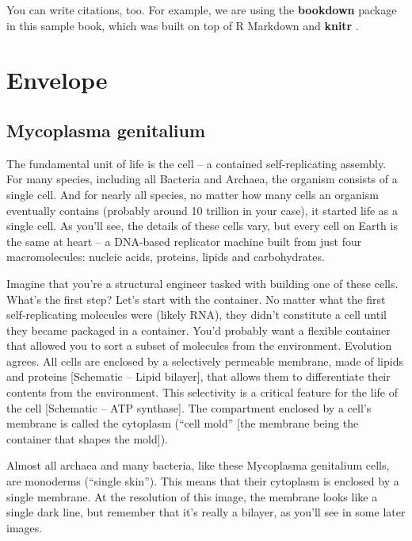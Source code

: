 \documentclass[]{book}
\begin{document}
You can write citations, too. For example, we are using the
\textbf{bookdown} package \citep{R-bookdown} in this sample book, which
was built on top of R Markdown and \textbf{knitr} \citep{xie2015}.

\chapter{Envelope}\label{envelope}

\section{Mycoplasma genitalium}\label{mycoplasma-genitalium}

The fundamental unit of life is the cell -- a contained self-replicating
assembly. For many species, including all Bacteria and Archaea, the
organism consists of a single cell. And for nearly all species, no
matter how many cells an organism eventually contains (probably around
10 trillion in your case), it started life as a single cell. As you'll
see, the details of these cells vary, but every cell on Earth is the
same at heart -- a DNA-based replicator machine built from just four
macromolecules: nucleic acids, proteins, lipids and carbohydrates.

Imagine that you're a structural engineer tasked with building one of
these cells. What's the first step? Let's start with the container. No
matter what the first self-replicating molecules were (likely RNA), they
didn't constitute a cell until they became packaged in a container.
You'd probably want a flexible container that allowed you to sort a
subset of molecules from the environment. Evolution agrees. All cells
are enclosed by a selectively permeable membrane, made of lipids and
proteins {[}Schematic -- Lipid bilayer{]}, that allows them to
differentiate their contents from the environment. This selectivity is a
critical feature for the life of the cell {[}Schematic -- ATP
synthase{]}. The compartment enclosed by a cell's membrane is called the
cytoplasm (``cell mold'' {[}the membrane being the container that shapes
the mold{]}).

Almost all archaea and many bacteria, like these Mycoplasma genitalium
cells, are monoderms (``single skin''). This means that their cytoplasm
is enclosed by a single membrane. At the resolution of this image, the
membrane looks like a single dark line, but remember that it's really a
bilayer, as you'll see in some later images.
\end{document}
